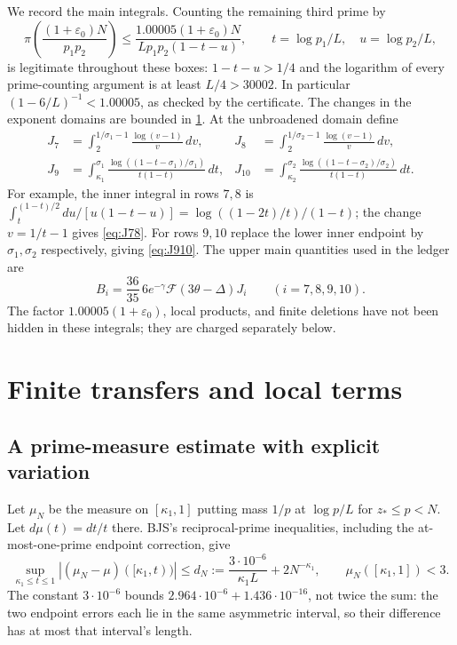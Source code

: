 \documentclass[11pt]{article}
\theoremstyle{definition}
\newcommand{\eps}{\varepsilon}
\newcommand{\Fup}{\mathcal F}
\begin{document}
We record the main integrals.  Counting the remaining third prime by
\[
 \pi\left(\frac{(1+\eps_0)N}{p_1p_2}\right)
 \le\frac{1.00005(1+\eps_0)N}
              {L p_1p_2(1-t-u)},\qquad
 t=\log p_1/L,\quad u=\log p_2/L,
\]
is legitimate throughout these boxes: $1-t-u>1/4$ and the logarithm
of every prime-counting argument is at least $L/4>30002$.
In particular $(1-6/L)^{-1}<1.00005$, as checked by the certificate.
The changes in the exponent domains are bounded in
\cref{sec:transfer}.  At the unbroadened domain define
\begin{align}
 J_7&=\int_2^{1/\sigma_1-1}\frac{\log(v-1)}v\,dv,&
 J_8&=\int_2^{1/\sigma_2-1}\frac{\log(v-1)}v\,dv,\label{eq:J78}\\
 J_9&=\int_{\kappa_1}^{\sigma_1}
       \frac{\log((1-t-\sigma_1)/\sigma_1)}{t(1-t)}\,dt,&
 J_{10}&=\int_{\kappa_2}^{\sigma_2}
       \frac{\log((1-t-\sigma_2)/\sigma_2)}{t(1-t)}\,dt.\label{eq:J910}
\end{align}
For example, the inner integral in rows $7,8$ is
$\int_t^{(1-t)/2}du/[u(1-t-u)]
 =\log((1-2t)/t)/(1-t)$; the change $v=1/t-1$ gives
\eqref{eq:J78}.  For rows $9,10$ replace the lower inner endpoint by
$\sigma_1,\sigma_2$ respectively, giving \eqref{eq:J910}.
The upper main quantities used in the ledger are
\begin{equation}\label{eq:Bi}
 B_i=\frac{36}{35}\,6e^{-\gamma}\Fup(3\theta-\Delta)J_i
 \qquad(i=7,8,9,10).
\end{equation}
The factor $1.00005(1+\eps_0)$, local products, and finite deletions have
not been hidden in these integrals; they are charged separately below.

\section{Finite transfers and local terms}\label{sec:transfer}

\subsection{A prime-measure estimate with explicit variation}

Let $\mu_N$ be the measure on $[\kappa_1,1]$ putting mass $1/p$ at
$\log p/L$ for $z_*\le p<N$.  Let $d\mu(t)=dt/t$ there.
BJS's reciprocal-prime inequalities, including the at-most-one-prime
endpoint correction, give
\begin{equation}\label{eq:measure-discrepancy}
 \sup_{\kappa_1\le t\le1}
 \left|(\mu_N-\mu)([\kappa_1,t))\right|
 \le d_N:=\frac{3\cdot10^{-6}}{\kappa_1L}+2N^{-\kappa_1},
 \qquad \mu_N([\kappa_1,1])<3.
\end{equation}
The constant $3\cdot10^{-6}$ bounds
$2.964\cdot10^{-6}+1.436\cdot10^{-16}$, not twice the sum:
the two endpoint errors each lie in the same asymmetric interval,
so their difference has at most that interval's length.
\end{document}
